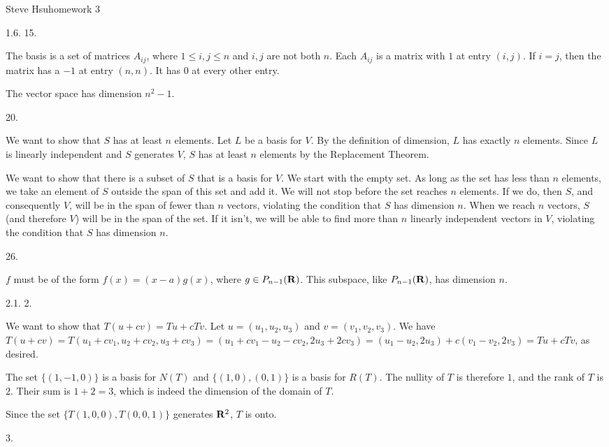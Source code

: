 \def\zero{{\bf 0}}
\def\real{{\bf R}}
\centerline{Steve Hsu\hfill homework 3}
\item{1.6.} 15.

The basis is a set of matrices $A_{ij}$, where
$1 \le i,j \le n$ and $i,j$ are not both $n$.
Each $A_{ij}$ is a matrix with $1$ at entry $(i,j)$.
If $i = j$, then the matrix has a $-1$ at entry $(n,n)$.
It has $0$ at every other entry.

The vector space has dimension $n^2 - 1$.
\bigskip
\item{} 20.

We want to show that $S$ has at least $n$ elements.
Let $L$ be a basis for $V$.
By the definition of dimension, $L$ has exactly $n$ elements.
Since $L$ is linearly independent and $S$ generates $V$,
$S$ has at least $n$ elements by the Replacement Theorem.

We want to show that there is a subset of $S$ that is a basis for $V$.
We start with the empty set.
As long as the set has less than $n$ elements, we take an element of $S$
outside the span of this set and add it.
We will not stop before the set reaches $n$ elements.
If we do, then $S$, and consequently $V$, will be in the span of
fewer than $n$ vectors, violating the condition that $S$ has dimension $n$.
When we reach $n$ vectors, $S$ (and therefore $V$)
will be in the span of the set.
If it isn't, we will be able to find more than $n$ linearly independent
vectors in $V$, violating the condition that $S$ has dimension $n$.
\bigskip
\item{} 26.

$f$ must be of the form $f(x) = (x - a)g(x)$,
where $g \in P_{n - 1}(\real)$.
This subspace, like $P_{n - 1}(\real)$, has dimension $n$.
\bigskip
\item{2.1.} 2.

We want to show that $T(u + cv) = Tu + cTv$.
Let $u = (u_1, u_2, u_3)$ and $v = (v_1, v_2, v_3)$.
We have $T(u + cv) = T(u_1 + cv_1, u_2 + cv_2, u_3 + cv_3) =
(u_1 + cv_1 - u_2 - cv_2, 2u_3 + 2cv_3) =
(u_1 - u_2, 2u_3) + c(v_1 - v_2, 2v_3) = Tu + cTv$, as desired.

The set $\{(1,-1,0)\}$ is a basis for $N(T)$ and
$\{(1,0), (0,1)\}$ is a basis for $R(T)$.
The nullity of $T$ is therefore $1$, and
the rank of $T$ is $2$.
Their sum is $1 + 2 = 3$, which is indeed the dimension of the domain of $T$.

Since the set $\{T(1,0,0), T(0,0,1)\}$ generates $\real^2$, $T$ is onto.
\bigskip
\item{} 3.

